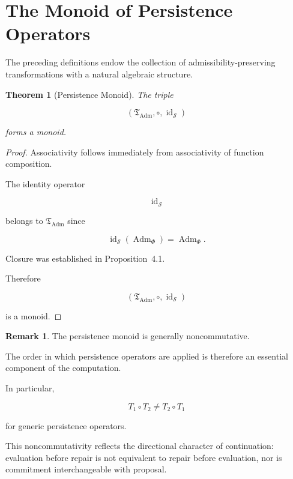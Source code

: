 \documentclass[11pt]{book}
\numberwithin{equation}{chapter}
\theoremstyle{definition}
\newtheorem{remark}[definition]{Remark}
\theoremstyle{plain}
\newtheorem{theorem}[definition]{Theorem}
\begin{document}
\section{The Monoid of Persistence Operators}

The preceding definitions endow the collection of admissibility-preserving
transformations with a natural algebraic structure.

\begin{theorem}[Persistence Monoid]

The triple

\[
\left(
\mathfrak T_{\operatorname{Adm}},
\circ,
\operatorname{id}_{\mathcal S}
\right)
\]

forms a monoid.

\end{theorem}

\begin{proof}

Associativity follows immediately from associativity of function
composition.

The identity operator

\[
\operatorname{id}_{\mathcal S}
\]

belongs to
\(
\mathfrak T_{\operatorname{Adm}}
\)
since

\[
\operatorname{id}_{\mathcal S}
(
\operatorname{Adm}_{\Phi}
)
=
\operatorname{Adm}_{\Phi}.
\]

Closure was established in Proposition~4.1.

Therefore

\[
\left(
\mathfrak T_{\operatorname{Adm}},
\circ,
\operatorname{id}_{\mathcal S}
\right)
\]

is a monoid.

\end{proof}

\begin{remark}

The persistence monoid is generally noncommutative.

The order in which persistence operators are applied is therefore an
essential component of the computation.

In particular,

\[
T_1\circ T_2
\neq
T_2\circ T_1
\]

for generic persistence operators.

This noncommutativity reflects the directional character of continuation:
evaluation before repair is not equivalent to repair before evaluation,
nor is commitment interchangeable with proposal.

\end{remark}
\end{document}
